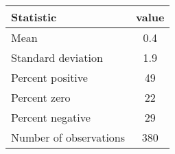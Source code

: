 \begin{tabular}{l c } 
    Statistic & value \\
    \midrule
    Mean & 0.4 \\
    Standard deviation & 1.9 \\
    Percent positive & 49 \\
    Percent zero & 22 \\
    Percent negative & 29 \\
    Number of observations & 380 \\
    \bottomrule
\end{tabular}
        
        
